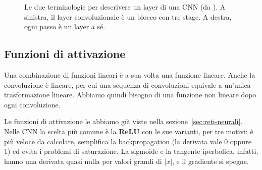 \begin{figure}[htbp]
\centering
{}
\caption{Le due terminologie per descrivere un layer di una CNN (da \cite{Goodfellow-et-al-2016}). A sinistra, il layer convoluzionale è un blocco con tre stage. A destra, ogni passo è un layer a sé.}
\label{fig:terminologia}
\end{figure}

\subsection{Funzioni di attivazione}
Una combinazione di funzioni lineari è a sua volta una funzione lineare. Anche la convoluzione è lineare, per cui una sequenza di convoluzioni equivale a un'unica trasformazione lineare. Abbiamo quindi bisogno di una funzione non lineare dopo ogni convoluzione.

Le funzioni di attivazione le abbiamo già viste nella sezione~\ref{sec:reti-neurali}. Nelle CNN la scelta più comune è la \textbf{ReLU} con le sue varianti, per tre motivi: è più veloce da calcolare, semplifica la backpropagation (la derivata vale 0 oppure 1) ed evita i problemi di saturazione. La sigmoide e la tangente iperbolica, infatti, hanno una derivata quasi nulla per valori grandi di $|x|$, e il gradiente si spegne.

